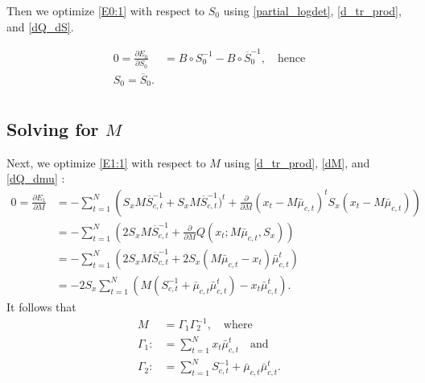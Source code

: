 \documentclass[12pt,leqno]{article}
\begin{document}
Then we optimize \eqref{E0:1} with respect to $S_0$ using \eqref{partial_logdet}, \eqref{d_tr_prod}, and \eqref{dQ_dS}.


\begin{equation}\label{S_0}
  \begin{split}
  0 = \frac{\partial{E_0}}{\partial{S_0}} &= B\circ{S_0^{-1}}- B\circ\overline{S}_0^{-1}, \quad\text{hence}\\
  S_0 = \overline{S}_0.\\
  \end{split}
\end{equation}

\subsection{Solving for $M$}
Next, we optimize \eqref{E1:1} with respect to $M$ using %
\eqref{d_tr_prod}, \eqref{dM}, and \eqref{dQ_dmu} :
\begin{equation}\label{M:0}
\begin{split}
  0 = \frac{\partial{E_1}}{\partial{M}} &= -\sum_{t=1}^N  \left(S_xM\overline{S}_{c,t}^{-1} + S_xM\overline{S}_{c,t}^{-1})^t + \frac{\partial}{\partial{M}}(x_t-M\bar{\mu}_{c,t})^tS_x(x_t-M\bar{\mu}_{c,t})\right) \\
  &= -\sum_{t=1}^N  \left(2S_xM\overline{S}_{c,t}^{-1}  + \frac{\partial}{\partial{M}}Q(x_t;M\bar{\mu}_{c,t},S_x)\right)\\
  &= -\sum_{t=1}^N  \left(2S_xM\overline{S}_{c,t}^{-1}  + 2S_x(M\bar{\mu}_{c,t} - x_t)\bar{\mu}_{c,t}^t\right)\\
  &= -2S_x\sum_{t=1}^N\left(M(S_{c,t}^{-1}+\bar{\mu}_{c,t}\bar{\mu}_{c,t}^t) - x_t\bar{\mu}_{c,t}^t\right).
\end{split}
\end{equation}
It follows that
\begin{equation}\label{M}
  \begin{split}
    M &= \Gamma_1\Gamma_2^{-1}, \quad\text{where}\\
    \Gamma_1 :&= \sum_{t=1}^N x_t\bar{\mu}_{c,t}^t\quad\text{and}\\
    \Gamma_2 :&= \sum_{t=1}^N S_{c,t}^{-1}+ \bar{\mu}_{c,t}\bar{\mu}_{c,t}^t.
  \end{split}
\end{equation}
\end{document}
